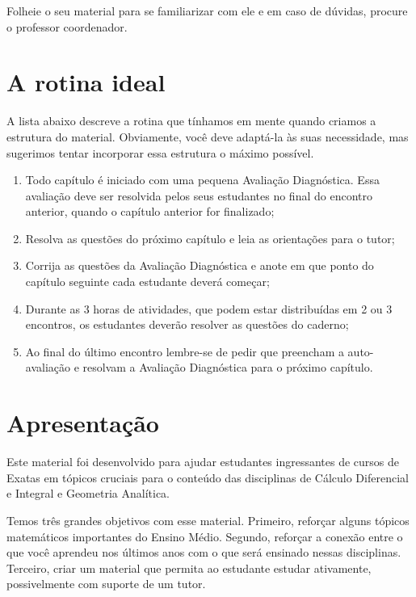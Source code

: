 Folheie o seu material para se familiarizar com ele e em caso de dúvidas, procure o professor coordenador.

\section{A rotina ideal}

A lista abaixo descreve a rotina que tínhamos em mente quando criamos a estrutura do material. Obviamente, você deve adaptá-la às suas necessidade, mas sugerimos tentar incorporar essa estrutura o máximo possível.

\begin{enumerate}
 \item Todo capítulo é iniciado com uma pequena Avaliação Diagnóstica. Essa avaliação deve ser resolvida pelos seus estudantes no final do encontro anterior, quando o capítulo anterior for finalizado;
 \item Resolva as questões do próximo capítulo e leia as orientações para o tutor;
 \item Corrija as questões da Avaliação Diagnóstica e anote em que ponto do capítulo seguinte cada estudante deverá começar;
 \item Durante as 3 horas de atividades, que podem estar distribuídas em 2 ou 3 encontros, os estudantes deverão resolver as questões do caderno;
 \item Ao final do último encontro lembre-se de pedir que preencham a auto-avaliação e resolvam a Avaliação Diagnóstica para o próximo capítulo.
\end{enumerate}

\paraAlunos

\section{Apresentação}

Este material foi desenvolvido para ajudar estudantes ingressantes de cursos de Exatas em tópicos cruciais para o conteúdo das disciplinas de Cálculo Diferencial e Integral e Geometria Analítica.

Temos três grandes objetivos com esse material. Primeiro, reforçar alguns tópicos matemáticos importantes do Ensino Médio. Segundo, reforçar a conexão entre o que você aprendeu nos últimos anos com o que será ensinado nessas disciplinas. Terceiro, criar um material que permita ao estudante estudar ativamente, possivelmente com suporte de um tutor.


